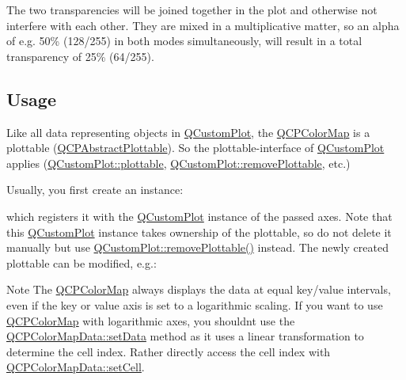 The two transparencies will be joined together in the plot and otherwise not interfere with each other. They are mixed in a multiplicative matter, so an alpha of e.\+g. 50\% (128/255) in both modes simultaneously, will result in a total transparency of 25\% (64/255).\hypertarget{class_q_c_p_color_map_qcpcolormap-usage}{}\subsection{Usage}\label{class_q_c_p_color_map_qcpcolormap-usage}
Like all data representing objects in \mbox{\hyperlink{class_q_custom_plot}{Q\+Custom\+Plot}}, the \mbox{\hyperlink{class_q_c_p_color_map}{Q\+C\+P\+Color\+Map}} is a plottable (\mbox{\hyperlink{class_q_c_p_abstract_plottable}{Q\+C\+P\+Abstract\+Plottable}}). So the plottable-\/interface of \mbox{\hyperlink{class_q_custom_plot}{Q\+Custom\+Plot}} applies (\mbox{\hyperlink{class_q_custom_plot_a32de81ff53e263e785b83b52ecd99d6f}{Q\+Custom\+Plot\+::plottable}}, \mbox{\hyperlink{class_q_custom_plot_af3dafd56884208474f311d6226513ab2}{Q\+Custom\+Plot\+::remove\+Plottable}}, etc.)

Usually, you first create an instance\+: 
\begin{DoxyCodeInclude}
\end{DoxyCodeInclude}
which registers it with the \mbox{\hyperlink{class_q_custom_plot}{Q\+Custom\+Plot}} instance of the passed axes. Note that this \mbox{\hyperlink{class_q_custom_plot}{Q\+Custom\+Plot}} instance takes ownership of the plottable, so do not delete it manually but use \mbox{\hyperlink{class_q_custom_plot_af3dafd56884208474f311d6226513ab2}{Q\+Custom\+Plot\+::remove\+Plottable()}} instead. The newly created plottable can be modified, e.\+g.\+: 
\begin{DoxyCodeInclude}
\end{DoxyCodeInclude}
 \begin{DoxyNote}{Note}
The \mbox{\hyperlink{class_q_c_p_color_map}{Q\+C\+P\+Color\+Map}} always displays the data at equal key/value intervals, even if the key or value axis is set to a logarithmic scaling. If you want to use \mbox{\hyperlink{class_q_c_p_color_map}{Q\+C\+P\+Color\+Map}} with logarithmic axes, you shouldn\textquotesingle{}t use the \mbox{\hyperlink{class_q_c_p_color_map_data_afd2083ccfd6987ec94aa7ef8e91ca39a}{Q\+C\+P\+Color\+Map\+Data\+::set\+Data}} method as it uses a linear transformation to determine the cell index. Rather directly access the cell index with \mbox{\hyperlink{class_q_c_p_color_map_data_a8e75eaf8746596319032a93f3d2d0683}{Q\+C\+P\+Color\+Map\+Data\+::set\+Cell}}. 
\end{DoxyNote}


